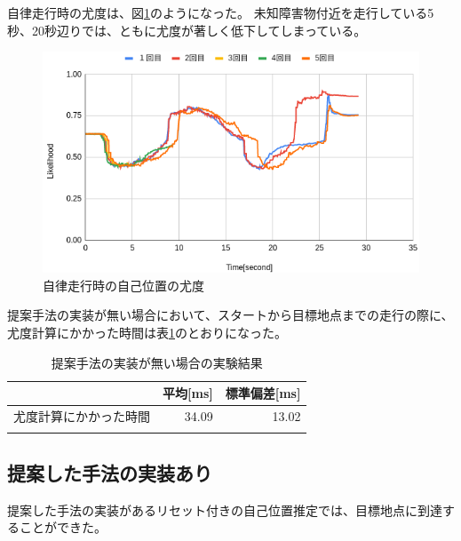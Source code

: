 自律走行時の尤度は、図\ref{fig:nav_likelihood_no_imp}のようになった。
未知障害物付近を走行している5秒、20秒辺りでは、ともに尤度が著しく低下してしまっている。

\begin{figure}[H]
  \begin{center}
    \includegraphics[width=0.98\linewidth]{figs/sim_likelihood_before.png}
    \caption{自律走行時の自己位置の尤度}
    \label{fig:nav_likelihood_no_imp}
  \end{center}
\end{figure}

提案手法の実装が無い場合において、スタートから目標地点までの走行の際に、
尤度計算にかかった時間は表\ref{tabule:likelihood_calc_time_sim_no_imp}のとおりになった。

\begin{table}[ht]
  \begin{center}
    \caption{提案手法の実装が無い場合の実験結果}
    \label{tabule:likelihood_calc_time_sim_no_imp}
    \begin{tabular}{l|r|r} 
      \thline
      & 平均[ms] &  標準偏差[ms] \\
      \hline
      尤度計算にかかった時間 & 34.09 & 13.02 \\
      \thline
    \end{tabular}
  \end{center}
\end{table}

\subsection{提案した手法の実装あり}

提案した手法の実装があるリセット付きの自己位置推定では、目標地点に到達することができた。

